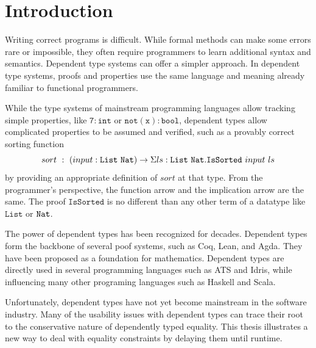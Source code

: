 \chapter{Introduction}
\label{chapter:Introduction}
\thispagestyle{myheadings}


Writing correct programs is difficult.
While formal methods can make some errors rare or impossible, they often require programmers to learn additional syntax and semantics.
Dependent type systems can offer a simpler approach.
In dependent type systems, proofs and properties use the same language and meaning already familiar to functional programmers.

While the type systems of mainstream programming languages allow tracking simple properties, like $\mathtt{7:int}$ or $\mathtt{not(x):bool}$, dependent types allow complicated properties to be assumed and verified, such as a provably correct sorting function
\[
sort\ :\ \left(input:\mathtt{List}\ \mathtt{Nat}{}\right)\rightarrow\Sigma ls:\mathtt{List}\ \mathtt{Nat}{}.\mathtt{IsSorted}\ input\ ls
\]
by providing an appropriate definition of $sort$ at that type.
From the programmer's perspective, the function arrow and the implication arrow are the same.
The proof $\mathtt{IsSorted}$ is no different than any other term of a datatype like $\mathtt{List}$ or $\mathtt{Nat}{}$.

The power of dependent types has been recognized for decades.
Dependent types form the backbone of several poof systems, such as Coq\cite{Coq12}, Lean\cite{10.1007/978-3-030-79876-5_37}, and Agda\cite{norell2007towards}.
They have been proposed as a foundation for mathematics\cite{Martin-Lof-1972,HoTTbook}.
Dependent types are directly used in several programming languages such as ATS\cite{DependentMLAnapproachtopracticalprogrammingwithdependenttypes} and Idris\cite{brady2013idris}, while influencing many other programing languages such as Haskell and Scala.

Unfortunately, dependent types have not yet become mainstream in the software industry.
Many of the usability issues with dependent types can trace their root to the conservative nature of dependently typed equality.
This thesis illustrates a new way to deal with equality constraints by delaying them until runtime.

